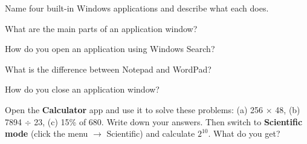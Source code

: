 \begin{reviewqs}
  \item Name four built-in Windows applications and describe what each does.
  \item What are the main parts of an application window?
  \item How do you open an application using Windows Search?
  \item What is the difference between Notepad and WordPad?
  \item How do you close an application window?
\end{reviewqs}

\begin{challenge}
Open the \textbf{Calculator} app and use it to solve these problems: (a) 256 $\times$ 48, (b) 7894 $\div$ 23, (c) 15\% of 680. Write down your answers. Then switch to \textbf{Scientific mode} (click the menu $\rightarrow$ Scientific) and calculate $2^{10}$. What do you get?
\end{challenge}
